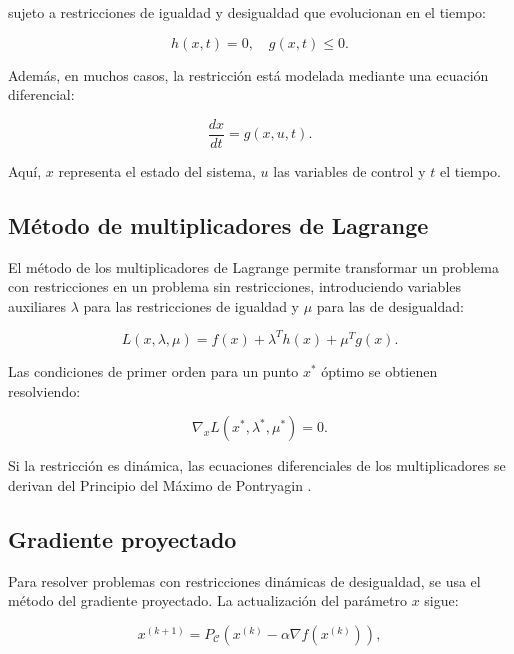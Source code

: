\begin{itemize}
		sujeto a restricciones de igualdad y desigualdad que evolucionan en el tiempo:
		
		\begin{equation}
			h(x, t) = 0, \quad g(x, t) \leq 0.
		\end{equation}
		
		Además, en muchos casos, la restricción está modelada mediante una ecuación diferencial:
		
		\begin{equation}
			\frac{dx}{dt} = g(x, u, t).
		\end{equation}
		
		Aquí, \( x \) representa el estado del sistema, \( u \) las variables de control y \( t \) el tiempo.
		
		\subsection{Método de multiplicadores de Lagrange}
		
		El método de los multiplicadores de Lagrange permite transformar un problema con restricciones en un problema sin restricciones, introduciendo variables auxiliares \( \lambda \) para las restricciones de igualdad y \( \mu \) para las de desigualdad:
		
		\begin{equation}
			L(x, \lambda, \mu) = f(x) + \lambda^T h(x) + \mu^T g(x).
		\end{equation}
		
		Las condiciones de primer orden para un punto \( x^* \) óptimo se obtienen resolviendo:
		
		\begin{equation}
			\nabla_x L(x^*, \lambda^*, \mu^*) = 0.
		\end{equation}
		
		Si la restricción es dinámica, las ecuaciones diferenciales de los multiplicadores se derivan del Principio del Máximo de Pontryagin \cite{pontryagin1962mathematical}.
		
		\subsection{Gradiente proyectado}
		
		Para resolver problemas con restricciones dinámicas de desigualdad, se usa el método del gradiente proyectado. La actualización del parámetro \( x \) sigue:
		
		\begin{equation}
			x^{(k+1)} = P_{\mathcal{C}}(x^{(k)} - \alpha \nabla f(x^{(k)})),
		\end{equation}
		

\end{itemize}
